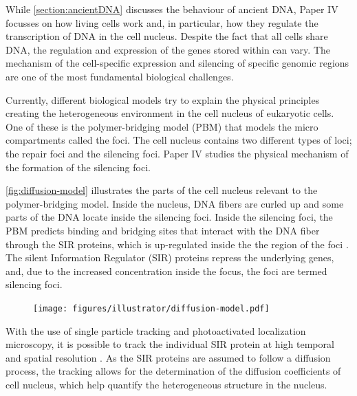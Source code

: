 While \autoref{section:ancientDNA} discusses the behaviour of ancient DNA, Paper IV focusses on how living cells work and, in particular, how they regulate the transcription of DNA in the cell nucleus.
Despite the fact that all cells share DNA, the regulation and expression of the genes stored within can vary. The mechanism of the cell-specific expression and silencing of specific genomic regions are one of the most fundamental biological challenges.

Currently, different biological models try to explain the physical principles creating the heterogeneous environment in the cell nucleus of eukaryotic cells.
One of these is the polymer-bridging model (PBM) that models the micro compartments called the foci. The cell nucleus contains two different types of loci; the repair foci and the silencing foci. Paper IV studies the physical mechanism of the formation of the silencing foci.

\autoref{fig:diffusion-model} illustrates the parts of the cell nucleus relevant to the polymer-bridging model. Inside the nucleus, DNA fibers are curled up and some parts of the DNA locate inside the silencing foci. Inside the silencing foci, the PBM predicts binding and bridging sites that interact with the DNA fiber through the SIR proteins, which is up-regulated inside the the region of the foci \autocite{heltbergPhysicalObservablesDetermine2021}. The silent Information Regulator (SIR) proteins repress the underlying genes, and, due to the increased concentration inside the focus, the foci are termed silencing foci.

\begin{figure}[htbp]
    \centering
    \texttt{[image: figures/illustrator/diffusion-model.pdf]}
\end{figure}

With the use of single particle tracking and photoactivated localization microscopy, it is possible to track the individual SIR protein at high temporal and spatial resolution \autocite{oswaldImagingQuantificationTransmembrane2014,manleyHighdensityMappingSinglemolecule2008}. As the SIR proteins are assumed to follow a diffusion process, the tracking allows for the determination of the diffusion coefficients of cell nucleus, which help quantify the heterogeneous structure in the nucleus.

